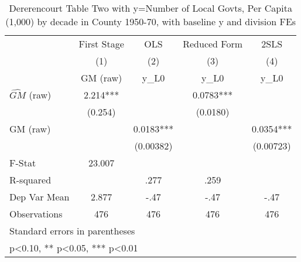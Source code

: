 \begin{table}[htbp]\centering
\def\sym#1{\ifmmode^{#1}\else\(^{#1}\)\fi}
\caption{Dererencourt Table Two with y=Number of Local Govts, Per Capita (1,000) by decade in County 1950-70, with baseline y and division FEs}
\begin{tabular}{l*{4}{c}}
\toprule
                    & First Stage   &         OLS   &Reduced Form   &        2SLS   \\
                    &\multicolumn{1}{c}{(1)}&\multicolumn{1}{c}{(2)}&\multicolumn{1}{c}{(3)}&\multicolumn{1}{c}{(4)}\\
                    &\multicolumn{1}{c}{GM  (raw)}&\multicolumn{1}{c}{y\_L0}&\multicolumn{1}{c}{y\_L0}&\multicolumn{1}{c}{y\_L0}\\
\midrule
$\hat{GM}$ (raw)    &       2.214***&               &      0.0783***&               \\
                    &     (0.254)   &               &    (0.0180)   &               \\
\addlinespace
GM  (raw)           &               &      0.0183***&               &      0.0354***\\
                    &               &   (0.00382)   &               &   (0.00723)   \\
\midrule
F-Stat              &      23.007   &               &               &               \\
R-squared           &               &        .277   &        .259   &               \\
Dep Var Mean        &       2.877   &        -.47   &        -.47   &        -.47   \\
Observations        &         476   &         476   &         476   &         476   \\
\bottomrule
\multicolumn{5}{l}{\footnotesize Standard errors in parentheses}\\
\multicolumn{5}{l}{\footnotesize * p<0.10, ** p<0.05, *** p<0.01}\\
\end{tabular}
\end{table}
